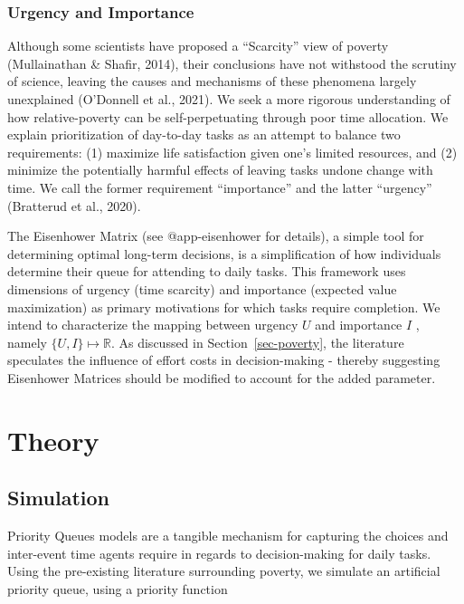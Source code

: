 \documentclass[
]{report}
\begin{document}
\hypertarget{urgency-and-importance}{%
\subsection{Urgency and Importance}\label{urgency-and-importance}}

Although some scientists have proposed a ``Scarcity'' view of poverty
(Mullainathan \& Shafir, 2014), their conclusions have not withstood the
scrutiny of science, leaving the causes and mechanisms of these
phenomena largely unexplained (O'Donnell et al., 2021). We seek a more
rigorous understanding of how relative-poverty can be self-perpetuating
through poor time allocation. We explain prioritization of day-to-day
tasks as an attempt to balance two requirements: (1) maximize life
satisfaction given one's limited resources, and (2) minimize the
potentially harmful effects of leaving tasks undone change with time. We
call the former requirement ``importance'' and the latter ``urgency''
(Bratterud et al., 2020).

The Eisenhower Matrix (see @app-eisenhower for details), a simple tool
for determining optimal long-term decisions, is a simplification of how
individuals determine their queue for attending to daily tasks. This
framework uses dimensions of urgency (time scarcity) and importance
(expected value maximization) as primary motivations for which tasks
require completion. We intend to characterize the mapping between
urgency \(U\) and importance \(I\) , namely
\(\{ U,I \} \mapsto \mathbb{R}\). As discussed in
Section~\ref{sec-poverty}, the literature speculates the influence of
effort costs in decision-making - thereby suggesting Eisenhower Matrices
should be modified to account for the added parameter.

\hypertarget{theory}{%
\chapter{Theory}\label{theory}}

\hypertarget{simulation}{%
\section{Simulation}\label{simulation}}

Priority Queues models are a tangible mechanism for capturing the
choices and inter-event time agents require in regards to
decision-making for daily tasks. Using the pre-existing literature
surrounding poverty, we simulate an artificial priority queue, using a
priority function
\end{document}

